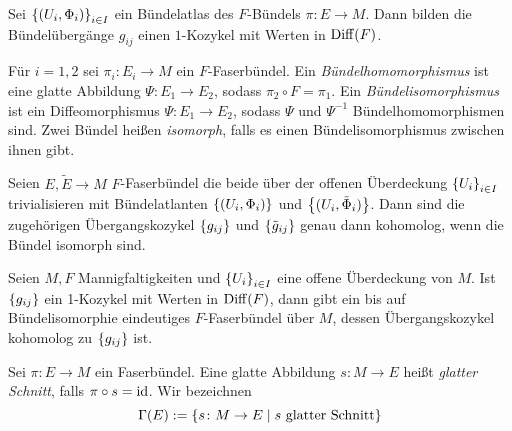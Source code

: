 \begin{proposition}
  Sei $\left\lbrace (U_i,\Phi_i) \right\rbrace_{i\in I}$ ein Bündelatlas des $F$-Bündels
  $\pi\colon E \to M$. Dann bilden die Bündelübergänge $g_{ij}$ einen
  $1$-Kozykel mit Werten in $\operatorname{Diff}(F)$.
\end{proposition}

\begin{definition}
  Für $i=1,2$ sei $\pi_i\colon E_i \to M$ ein $F$-Faserbündel. Ein
  \emph{Bündelhomomorphismus} 
  ist eine glatte Abbildung $\Psi\colon E_1 \to E_2$, sodass
  $\pi_2\circ F = \pi_1$. Ein \emph{Bündelisomorphismus} ist ein
  Diffeomorphismus $\Psi\colon E_1\to E_2$, sodass $\Psi$ und
  $\Psi^{-1}$ Bündelhomomorphismen sind. Zwei Bündel heißen
  \emph{isomorph}, falls es einen Bündelisomorphismus zwischen ihnen gibt.
\end{definition}

\begin{proposition}
  Seien $E,\tilde E \to M$ $F$-Faserbündel die beide über der offenen
  Überdeckung $\left\lbrace U_i \right\rbrace_{i\in I}$ trivialisieren mit Bündelatlanten
  $\left\lbrace (U_i,\Phi_i) \right\rbrace$ und $\left\lbrace (U_i,\tilde \Phi_i) \right\rbrace$. Dann sind die
  zugehörigen Übergangskozykel $\left\lbrace g_{ij} \right\rbrace$ und
  $\left\lbrace \tilde{g}_{ij} \right\rbrace$ genau dann kohomolog, wenn die Bündel
  isomorph sind.
\end{proposition}

\begin{satz}
  Seien $M,F$ Mannigfaltigkeiten und $\left\lbrace U_i \right\rbrace_{i\in I}$ eine offene
  Überdeckung von $M$. Ist $\left\lbrace g_{ij} \right\rbrace$ ein 1-Kozykel mit Werten in
  $\operatorname{Diff}(F)$, dann gibt ein bis auf Bündelisomorphie eindeutiges
  $F$-Faserbündel über $M$, dessen Übergangskozykel kohomolog zu
  $\left\lbrace g_{ij} \right\rbrace$ ist.
\end{satz}

\begin{definition}
  Sei $\pi\colon E \to M$ ein Faserbündel. Eine glatte Abbildung $s \colon M \to E$
  heißt \emph{glatter Schnitt}, falls $\pi\circ s = \operatorname{id}$. Wir
  bezeichnen
  \begin{equation*}
    \Gamma(E) := \left\lbrace s\colon M \to E\mid s\text{ glatter Schnitt} \right\rbrace
  \end{equation*}
\end{definition}

